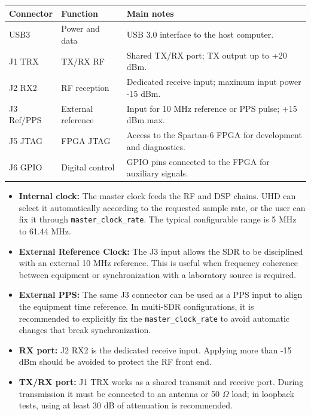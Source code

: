 \documentclass[11pt]{article}
\begin{document}
\begin{table}[h]
    \centering
    \begin{tabular}{p{}p{}p{}}
        \toprule
        \textbf{Connector} & \textbf{Function} & \textbf{Main notes} \\
        \midrule
        USB3 & Power and data & USB 3.0 interface to the host computer. \\
        J1 TRX & TX/RX RF & Shared TX/RX port; TX output up to +20 dBm. \\
        J2 RX2 & RF reception & Dedicated receive input; maximum input power -15 dBm. \\
        J3 Ref/PPS & External reference & Input for 10 MHz reference or PPS pulse; +15 dBm max. \\
        J5 JTAG & FPGA JTAG & Access to the Spartan-6 FPGA for development and diagnostics. \\
        J6 GPIO & Digital control & GPIO pins connected to the FPGA for auxiliary signals. \\
        \bottomrule
    \end{tabular}
\end{table}

\begin{itemize}
    \item \textbf{Internal clock:} The master clock feeds the RF and DSP chains. UHD can select it automatically according to the requested sample rate, or the user can fix it through \texttt{master\_clock\_rate}. The typical configurable range is 5 MHz to 61.44 MHz.
    \item \textbf{External Reference Clock:} The J3 input allows the SDR to be disciplined with an external 10 MHz reference. This is useful when frequency coherence between equipment or synchronization with a laboratory source is required.
    \item \textbf{External PPS:} The same J3 connector can be used as a PPS input to align the equipment time reference. In multi-SDR configurations, it is recommended to explicitly fix the \texttt{master\_clock\_rate} to avoid automatic changes that break synchronization.
    \item \textbf{RX port:} J2 RX2 is the dedicated receive input. Applying more than -15 dBm should be avoided to protect the RF front end.
    \item \textbf{TX/RX port:} J1 TRX works as a shared transmit and receive port. During transmission it must be connected to an antenna or 50 $\Omega$ load; in loopback tests, using at least 30 dB of attenuation is recommended.
\end{itemize}
\end{document}
